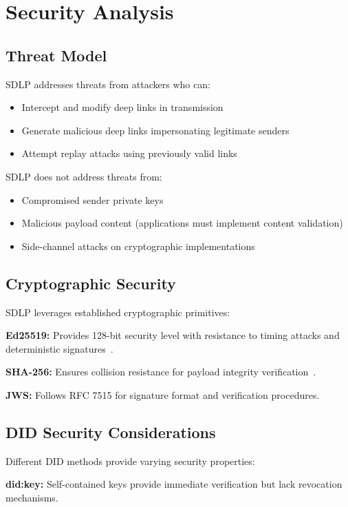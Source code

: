 \documentclass[conference]{IEEEtran}
\begin{document}
\section{Security Analysis}

\subsection{Threat Model}

SDLP addresses threats from attackers who can:
\begin{itemize}
    \item Intercept and modify deep links in transmission
    \item Generate malicious deep links impersonating legitimate senders
    \item Attempt replay attacks using previously valid links
\end{itemize}

SDLP does not address threats from:
\begin{itemize}
    \item Compromised sender private keys
    \item Malicious payload content (applications must implement content validation)
    \item Side-channel attacks on cryptographic implementations
\end{itemize}

\subsection{Cryptographic Security}

SDLP leverages established cryptographic primitives:

\textbf{Ed25519:} Provides 128-bit security level with resistance to timing attacks and deterministic signatures~\cite{ed25519}.

\textbf{SHA-256:} Ensures collision resistance for payload integrity verification~\cite{sha256-security}.

\textbf{JWS:} Follows RFC 7515 for signature format and verification procedures.

\subsection{DID Security Considerations}

Different DID methods provide varying security properties:

\textbf{did:key:} Self-contained keys provide immediate verification but lack revocation mechanisms.
\end{document}
